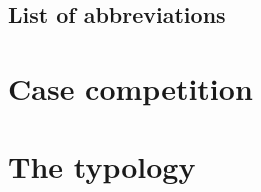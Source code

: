 \documentclass[hidelinks,a4paper,twoside,openright,14pt]{memoir}
\begin{document}
\begin{titlingpage}
{}

\vspace{5em}
\phantom{x}
\vspace{5em}
\phantom{x}
\vspace{5em}
\phantom{x}
\vspace{5em}
\phantom{x}
\vspace{5em}
\phantom{x}
\vspace{5em}
\phantom{x}
\vspace{5em}
\phantom{x}
\vspace{5em}
\phantom{x}
\vspace{5em}
\phantom{x}
\vspace{5em}
\phantom{x}
\vspace{5em}
\phantom{x}

\thispagestyle{empty}

\end{titlingpage}


\clearpage

\phantom{x}
\vspace{-7em}
\tableofcontents
\clearpage

\phantom{x}
\vspace{-7em}
\listoftables
\clearpage

\phantom{x}
\vspace{-7em}
\listoffigures
\clearpage


\chapter*[List of abbreviations]{List of abbreviations}
\begingroup
  \setlength{\LTleft}{-\tabcolsep}
\printacronyms[include=abbr, heading=none]
\endgroup
{}
\clearpage

\mainmatter
\setcounter{secnumdepth}{4}



\part{Case competition}\label{part:case-facts}



\part{The typology}\label{part:variation}


\end{document}
